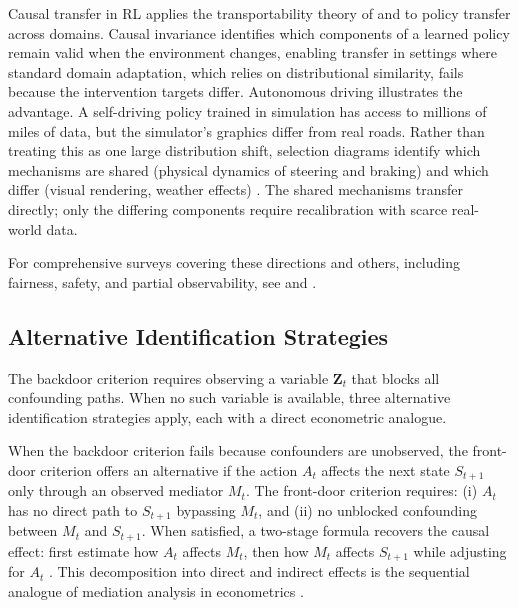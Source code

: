 Causal transfer in RL applies the transportability theory of \citet{pearl2014external} and \citet{bareinboim2016causal} to policy transfer across domains. Causal invariance identifies which components of a learned policy remain valid when the environment changes, enabling transfer in settings where standard domain adaptation, which relies on distributional similarity, fails because the intervention targets differ. Autonomous driving illustrates the advantage. A self-driving policy trained in simulation has access to millions of miles of data, but the simulator's graphics differ from real roads. Rather than treating this as one large distribution shift, selection diagrams identify which mechanisms are shared (physical dynamics of steering and braking) and which differ (visual rendering, weather effects) \citep{bareinboim2016causal}. The shared mechanisms transfer directly; only the differing components require recalibration with scarce real-world data.

For comprehensive surveys covering these directions and others, including fairness, safety, and partial observability, see \citet{deng2023causal} and \citet{dacostacunha2025unifying}.

\subsection{Alternative Identification Strategies}
\label{subsec:alternative_identification}

The backdoor criterion requires observing a variable $\mathbf{Z}_t$ that blocks all confounding paths. When no such variable is available, three alternative identification strategies apply, each with a direct econometric analogue.

When the backdoor criterion fails because confounders are unobserved, the front-door criterion offers an alternative if the action $A_t$ affects the next state $S_{t+1}$ only through an observed mediator $M_t$. The front-door criterion requires: (i) $A_t$ has no direct path to $S_{t+1}$ bypassing $M_t$, and (ii) no unblocked confounding between $M_t$ and $S_{t+1}$. When satisfied, a two-stage formula recovers the causal effect: first estimate how $A_t$ affects $M_t$, then how $M_t$ affects $S_{t+1}$ while adjusting for $A_t$ \citep{pearl2009causality}. This decomposition into direct and indirect effects is the sequential analogue of mediation analysis in econometrics \citep{dacostacunha2025unifying}.

